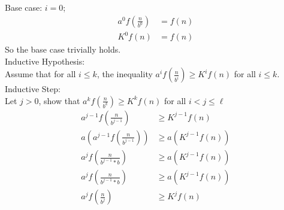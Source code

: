 \documentclass{article}
\begin{document}
\begin{enumerate}
Base case: $i=0$; \\
\begin{align*}
    a^{0}f({\frac{n}{b^{0}}}) & = f(n) \\
    K^{0}f(n) & = f(n)
\end{align*}
So the base case trivially holds. \\
\newline 
Inductive Hypothesis: \\
Assume that for all $i \leq k$, the inequality $a^{i}f(\frac{n}{b^{i}}) \geq K^{i}f(n)$ for all $i \leq k$. \\
\newline 
Inductive Step: \\
Let $j > 0$, show that $a^{k}f(\frac{n}{b^{k}}) \geq K^{k}f(n)$ for all $i < j \leq \ell$
\begin{align*}
    a^{j-1}f(\frac{n}{b^{j-1}}) & \geq K^{j-1}f(n) \\
    a(a^{j-1}f(\frac{n}{b^{j-1}})) & \geq a(K^{j-1}f(n)) \\
    a^{j}f(\frac{n}{b^{j-1}*b}) & \geq a(K^{j-1}f(n)) \\
    a^{j}f(\frac{n}{b^{j-1}*b}) & \geq a(K^{j-1}f(n)) \\
    a^{j}f(\frac{n}{b^{j}}) & \geq K^{j}f(n)
\end{align*}










\end{enumerate}
\end{document}
